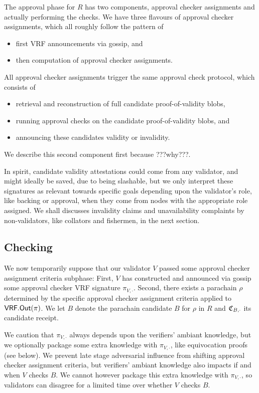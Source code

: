The approval phase for $R$ has two components, approval checker assignments and actually performing the checks.  We have three flavours of approval checker assignments, which all roughly follow the pattern of
\begin{itemize}
\item first VRF announcements via gossip, and
\item then computation of approval checker assignments.
\end{itemize}
\noindent 
All approval checker assignments trigger the same approval check protocol, which consists of
\begin{itemize}
\item retrieval and reconstruction of full candidate proof-of-validity blobs, 
\item running approval checks on the candidate proof-of-validity blobs, and 
\item announcing these candidates validity or invalidity.
\end{itemize}
We describe this second component first because ???why???.

In spirit, candidate validity attestations could come from any validator, and might ideally be saved, due to being slashable, but we only interpret these signatures as relevant towards specific goals depending upon the validator's role, like backing or approval, when they come from nodes with the appropriate role assigned.  We shall discusses invalidity claims and unavailability complaints by non-validators, like collators and fishermen, in the next section.


\subsection{Checking}
\label{sec:approcal_checks}

We now temporarily suppose that our validator $V$ passed some approval checker assignment criteria subphase:  First, $V$ has constructed and announced via gossip some approval checker VRF signature $\pi_{V,\cdot}$.  Second, there exists a parachain $\rho$ determined by the specific approval checker assignment criteria applied to $\mathsf{VRF}.\mathsf{Out}(\pi)$.  We let $B$ denote the parachain candidate $B$ for $\rho$ in $R$ and $\mathfrak{C}_{B,\cdot}$ its candidate receipt.  

We caution that $\pi_{V,\cdot}$ always depends upon the verifiers' ambiant knowledge, but we optionally package some extra knowledge with $\pi_{V,\cdot}$, like equivocation proofs (see below).  We prevent late stage adversarial influence from shifting approval checker assignment criteria, but verifiers' ambiant knowledge also impacts if and when $V$ checks $B$.  We cannot however package this extra knowledge with $\pi_{V,\cdot}$, so validators can disagree for a limited time over whether $V$ checks $B$.

